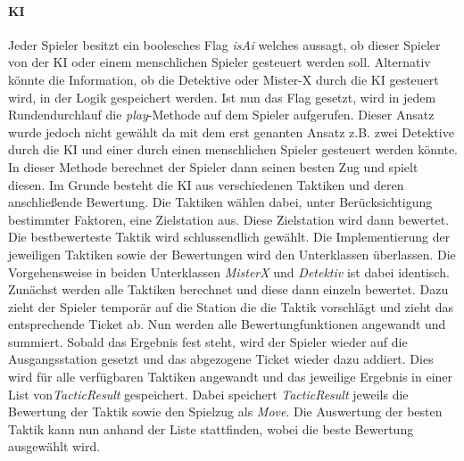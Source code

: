                 \paragraph{KI}
                    Jeder Spieler besitzt ein boolesches Flag \textit{isAi} welches aussagt, ob dieser Spieler von der KI oder einem menschlichen Spieler
                    gesteuert werden soll.
                    Alternativ könnte die Information, ob die Detektive oder Mister-X durch die KI gesteuert wird, in der Logik gespeichert werden.
                    Ist nun das Flag gesetzt, wird in jedem Rundendurchlauf die \textit{play}-Methode auf dem Spieler aufgerufen.
                    Dieser Ansatz wurde jedoch nicht gewählt da mit dem erst genanten Ansatz z.B.
                    zwei Detektive durch die KI und einer durch einen menschlichen Spieler gesteuert werden könnte.
                    In dieser Methode berechnet der Spieler dann seinen besten Zug und spielt diesen.
                    Im Grunde besteht die KI aus verschiedenen Taktiken und deren anschließende Bewertung.
                    Die Taktiken wählen dabei, unter Berücksichtigung bestimmter Faktoren, eine Zielstation aus.
                    Diese Zielstation wird dann bewertet. Die bestbewerteste Taktik wird schlussendlich gewählt.
                    Die Implementierung der jeweiligen Taktiken sowie der Bewertungen wird den Unterklassen überlassen.
                    \newline
                    \newline
                    Die Vorgehensweise in beiden Unterklassen \textit{MisterX} und \textit{Detektiv} ist dabei identisch.
                    Zunächst werden alle Taktiken berechnet und diese dann einzeln bewertet.
                    Dazu zieht der Spieler temporär auf die Station die die Taktik vorschlägt und zieht das entsprechende Ticket ab.
                    Nun werden alle Bewertungfunktionen angewandt und summiert. Sobald das Ergebnis fest steht, wird der Spieler wieder auf 
                    die Ausgangsstation gesetzt und das abgezogene Ticket wieder dazu addiert.
                    Dies wird für alle verfügbaren Taktiken angewandt und das jeweilige Ergebnis in einer List von\textit{TacticResult}
                    gespeichert. Dabei speichert \textit{TacticResult} jeweils die Bewertung der Taktik sowie den Spielzug als \textit{Move}.
                    Die Auswertung der besten Taktik kann nun anhand der Liste stattfinden, wobei die beste Bewertung ausgewählt wird.
                    

